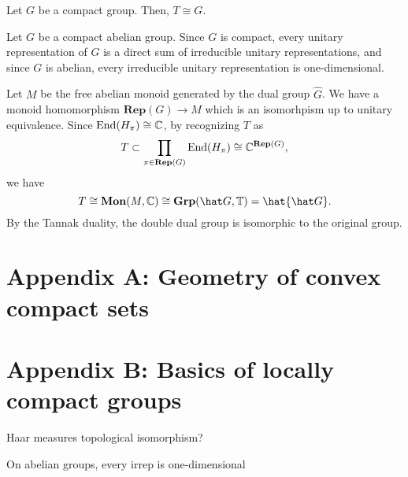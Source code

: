 \documentclass[12pt]{article}
\begin{document}
\begin{thm}
Let $G$ be a compact group.
Then, $T\cong G$.
\end{thm}

\begin{ex}
Let $G$ be a compact abelian group.
Since $G$ is compact, every unitary representation of $G$ is a direct sum of irreducible unitary representations, and since $G$ is abelian, every irreducible unitary representation is one-dimensional.

Let $M$ be the free abelian monoid generated by the dual group $\hat G$.
We have a monoid homomorphism $\mathbf{Rep}(G)\to M$ which is an isomorhpism up to unitary equivalence.
Since $\operatorname{End}(H_\pi)\cong\mathbb{C}$, by recognizing $T$ as
\[T\subset\prod_{\pi\in\mathbf{Rep}(G)}\operatorname{End}(H_\pi)\cong\mathbb{C}^{\mathbf{Rep}(G)},\]
we have
\[T\cong\mathbf{Mon}(M,\C)\cong\mathbf{Grp}(\hat G,\T)=\hat{\hat G}.\]
By the Tannak duality, the double dual group is isomorphic to the original group.
\end{ex}





\newpage

\section*{Appendix A: Geometry of convex compact sets}

\section*{Appendix B: Basics of locally compact groups}
Haar measures
topological isomorphism?



\begin{defn}

\end{defn}

\begin{thm}

\end{thm}

\begin{cor}
On abelian groups, every irrep is one-dimensional
\end{cor}
\end{document}
